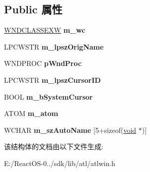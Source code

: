 \subsection*{Public 属性}
\begin{DoxyCompactItemize}
\item 
\mbox{\label{struct_a_t_l_1_1___a_t_l___w_n_d_c_l_a_s_s_i_n_f_o_w_af94b4e7eed25218d301a9b2b6182c7a0}} 
\hyperlink{struct___w_n_d_c_l_a_s_s_e_x_w}{W\+N\+D\+C\+L\+A\+S\+S\+E\+XW} {\bfseries m\+\_\+wc}
\item 
\mbox{\label{struct_a_t_l_1_1___a_t_l___w_n_d_c_l_a_s_s_i_n_f_o_w_ad84674986b50d81e954d18481f875532}} 
L\+P\+C\+W\+S\+TR {\bfseries m\+\_\+lpsz\+Orig\+Name}
\item 
\mbox{\label{struct_a_t_l_1_1___a_t_l___w_n_d_c_l_a_s_s_i_n_f_o_w_ad38b59d2f2d6943959ac57e6299c1ef8}} 
W\+N\+D\+P\+R\+OC {\bfseries p\+Wnd\+Proc}
\item 
\mbox{\label{struct_a_t_l_1_1___a_t_l___w_n_d_c_l_a_s_s_i_n_f_o_w_a51422f52f4eda5c5f01e4d13f6f87c23}} 
L\+P\+C\+W\+S\+TR {\bfseries m\+\_\+lpsz\+Cursor\+ID}
\item 
\mbox{\label{struct_a_t_l_1_1___a_t_l___w_n_d_c_l_a_s_s_i_n_f_o_w_a91f93416a10f4d38361d893968cf619d}} 
B\+O\+OL {\bfseries m\+\_\+b\+System\+Cursor}
\item 
\mbox{\label{struct_a_t_l_1_1___a_t_l___w_n_d_c_l_a_s_s_i_n_f_o_w_ad8889c1841c768ccfce68922bdbc52f7}} 
A\+T\+OM {\bfseries m\+\_\+atom}
\item 
\mbox{\label{struct_a_t_l_1_1___a_t_l___w_n_d_c_l_a_s_s_i_n_f_o_w_a07cf2c71315367627d7c3c7f1433fb51}} 
W\+C\+H\+AR {\bfseries m\+\_\+sz\+Auto\+Name} \mbox{[}5+sizeof(\hyperlink{interfacevoid}{void} $\ast$)\mbox{]}
\end{DoxyCompactItemize}


该结构体的文档由以下文件生成\+:\begin{DoxyCompactItemize}
\item 
E\+:/\+React\+O\+S-\/0../sdk/lib/atl/atlwin.\+h\end{DoxyCompactItemize}
